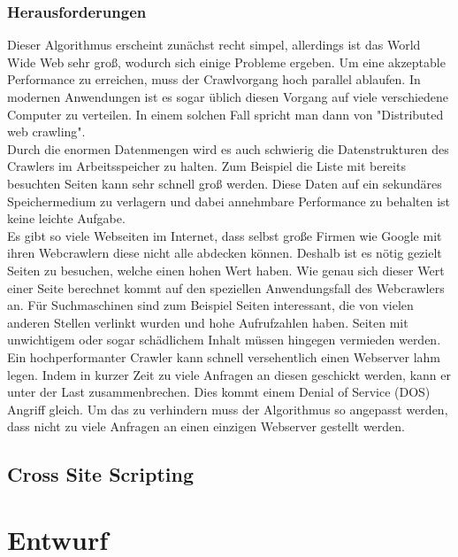 \subsection{Herausforderungen}
Dieser Algorithmus erscheint zunächst recht simpel, allerdings ist das World Wide Web sehr groß, wodurch sich einige Probleme ergeben. %
Um eine akzeptable Performance zu erreichen, muss der Crawlvorgang hoch parallel ablaufen. In modernen Anwendungen ist es sogar üblich diesen Vorgang auf viele verschiedene Computer zu verteilen. In einem solchen Fall spricht man dann von "Distributed web crawling". \\
Durch die enormen Datenmengen wird es auch schwierig die Datenstrukturen des Crawlers im Arbeitsspeicher zu halten. Zum Beispiel die Liste mit bereits besuchten Seiten kann sehr schnell groß werden. Diese Daten auf ein sekundäres Speichermedium zu verlagern und dabei annehmbare Performance zu behalten ist keine leichte Aufgabe. \\
Es gibt so viele Webseiten im Internet, dass selbst große Firmen wie Google mit ihren Webcrawlern diese nicht alle abdecken können. Deshalb ist es nötig gezielt Seiten zu besuchen, welche einen hohen Wert haben. Wie genau sich dieser Wert einer Seite berechnet kommt auf den speziellen Anwendungsfall des Webcrawlers an. Für Suchmaschinen sind zum Beispiel Seiten interessant, die von vielen anderen Stellen verlinkt wurden und hohe Aufrufzahlen haben. Seiten mit unwichtigem oder sogar schädlichem Inhalt müssen hingegen vermieden werden. \\
Ein hochperformanter Crawler kann schnell versehentlich einen Webserver lahm legen. Indem in kurzer Zeit zu viele Anfragen an diesen geschickt werden, kann er unter der Last zusammenbrechen. Dies kommt einem Denial of Service (DOS) Angriff gleich. Um das zu verhindern muss der Algorithmus so angepasst werden, dass nicht zu viele Anfragen an einen einzigen Webserver gestellt werden.



\section{Cross Site Scripting}
\chapter{Entwurf}

